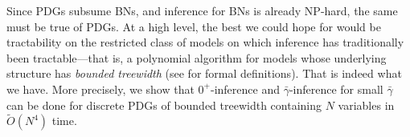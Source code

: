 \documentclass{article}
\newcommand\zogamma{{\bar\gamma}}
\newcommand\vjoe[1]{{\color{joecolor}\textbf{$\boldsymbol\{$Joe: }#1 \textbf{$\boldsymbol\}$}}}
\newcommand\otodo[2][]{\todo[color=olicolor!30!white,#1]{#2}}
\begin{document}
Since PDGs subsume BNs, and inference for BNs is already NP-hard, the same must be true of PDGs.
At a high level, the best we could hope for would be tractability on the restricted
class of models on which inference has traditionally been tractable---that is, a polynomial algorithm for models whose
underlying structure has \emph{bounded treewidth} (see
 for formal definitions).
That is indeed what we have.  
More precisely, we show that
$0^+$-inference
and $\zogamma$-inference for small $\zogamma$ 
can be done 
for discrete PDGs of bounded treewidth containing $N$ variables in
$\tilde O(N^4)$ 
time.
\end{document}
